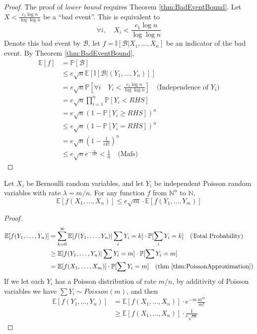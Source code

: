 \begin{proof}
            The proof of \emph{lower bound} requires Theorem \ref{thm:BadEventBound}. Let $X < \frac{c_1\log n}{\log\log n}$ be a ``bad event''. This is equivalent to
            \[ \forall i, \quad X_i < \frac{c_1\log n}{\log\log n} \]
            Denote this bad event by $\mathcal{B}$, let $f = \mathbb{I}[\mathcal{B}|X_1,\dots,X_n]$ be an indicator of the bad event. By Theorem \ref{thm:BadEventBound},
            \begin{align*}
                \mathbb{E}[f] &= \mathbb{P}[\mathcal{B}]\\
                &\le e\sqrt{n} \mathbb{E}[\mathbb{I}[\mathcal{B}|(Y_1,\dots,Y_n)]]\\
                &= e\sqrt{n} \mathbb{P}[\forall i \quad Y_i < \frac{c_1\log n}{\log\log n}] \quad \text{(Independence of $Y_i$)}\\
                &= e\sqrt{n}\prod_{i=1}^n \mathbb{P}[Y_i < RHS]\\
                &= e\sqrt{n}(1-\mathbb{P}[Y_i \ge RHS])^n\\
                &\le e\sqrt{n}(1-\mathbb{P}[Y_i = RHS])^n\\
                &= e\sqrt{n}\left(1-\frac{1}{ek!}\right)^n\\
                &\le e\sqrt{n} e^{-\frac{n}{ek!}} < \frac{1}{n} \quad \text{(Mafs)}
            \end{align*}
        \end{proof}
        \begin{theorem}\label{thm:BadEventBound}
            Let $X_i$ be Bernoulli random variables, and let $Y_i$ be independent Poisson random variables with rate $\lambda = m/n$. For any function $f$ from $\mathbb{N}^n$ to $\mathbb{N}$,
            \[ \mathbb{E}[f(X_1, \dots, X_n)] \le e\sqrt{m}\cdot\mathbb{E}[f(Y_1,\dots,Y_m)] \]
        \end{theorem}
        \begin{proof}
            \begin{align*}
                \mathbb{E}[f(Y_1,\dots,Y_n)] &= \sum_{k=0}^{\infty}\mathbb{E}[f(Y_1,\dots,Y_n) | \sum_i Y_i = k] \cdot \mathbb{P}[\sum_i Y_i = k] \quad \text{(Total Probability)}\\
                &\ge \mathbb{E}[f(Y_1,\dots,Y_n)|\sum Y_i = m]\cdot \mathbb{P}[\sum Y_i = m]\\
                &= \mathbb{E}[f(X_1,\dots,X_m)]\cdot\mathbb{P}[\sum Y_i = m] \quad \text{(thm \ref{thm:PoissonApproximation})}
            \end{align*}
            If we let each $Y_i$ has a Poisson distribution of rate $m/n$, by additivity of Poisson variables we have $\sum Y_i \sim Poisson(m)$, and then
            \begin{align*}
                \mathbb{E}[f(Y_1,\dots,Y_n)] &= \mathbb{E}[f(X_1,\dots,X_n)]\cdot e^{-m}\frac{m^m}{m!}\\
                &\ge \mathbb{E}[f(X_1,\dots,X_n)]\cdot\frac{1}{e\sqrt{m}}
            \end{align*}
        \end{proof}

